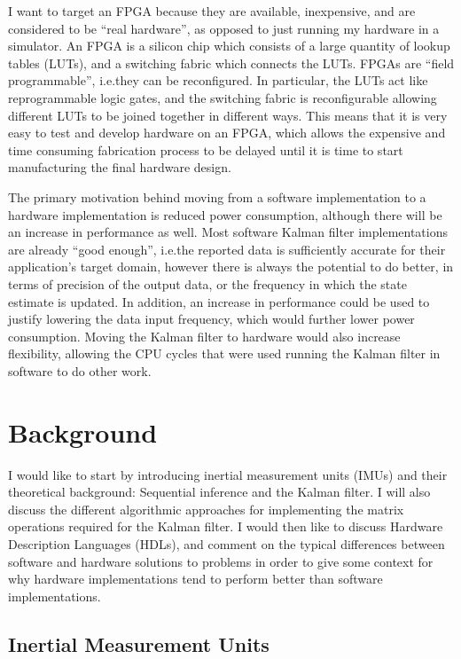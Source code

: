 \documentclass[12pt]{article}
\begin{document}
I want to target an FPGA because they are available, inexpensive, and are considered to be ``real hardware'', as opposed to just running my hardware in a simulator. An FPGA is a silicon chip which consists of a large quantity of lookup tables (LUTs), and a switching fabric which connects the LUTs. FPGAs are ``field programmable'', i.e.\@ they can be reconfigured. In particular, the LUTs act like reprogrammable logic gates, and the switching fabric is reconfigurable allowing different LUTs to be joined together in different ways. This means that it is very easy to test and develop hardware on an FPGA, which allows the expensive and time consuming fabrication process to be delayed until it is time to start manufacturing the final hardware design.

The primary motivation behind moving from a software implementation to a hardware implementation is reduced power consumption, although there will be an increase in performance as well. Most software Kalman filter implementations are already ``good enough'', i.e.\@ the reported data is sufficiently accurate for their application's target domain, however there is always the potential to do better, in terms of precision of the output data, or the frequency in which the state estimate is updated. In addition, an increase in performance could be used to justify lowering the data input frequency, which would further lower power consumption. Moving the Kalman filter to hardware would also increase flexibility, allowing the CPU cycles that were used running the Kalman filter in software to do other work.

\section{Background}

I would like to start by introducing inertial measurement units (IMUs) and their theoretical background: Sequential inference and the Kalman filter. I will also discuss the different algorithmic approaches for implementing the matrix operations required for the Kalman filter. I would then like to discuss Hardware Description Languages (HDLs), and comment on the typical differences between software and hardware solutions to problems in order to give some context for why hardware implementations tend to perform better than software implementations.

\subsection{Inertial Measurement Units}
\end{document}
